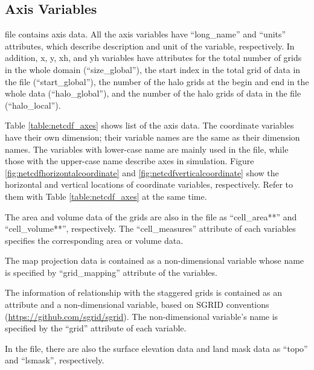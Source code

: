 \subsection{Axis Variables}
\scalenetcdf file contains axis data.
All the axis variables have 
``long\_name'' and ``units'' attributes,
which describe description and unit of the variable, respectively.
In addition, x, y, xh, and yh variables 
have attributes for the total number of grids in the whole domain (``size\_global''),
the start index in the total grid of data in the file (``start\_global''),
the number of the halo grids at the begin and end in the whole data (``halo\_global''),
and the number of the halo grids of data in the file (``halo\_local'').

Table \ref{table:netcdf_axes} shows list of the axis data.
The coordinate variables have their own dimension; their variable names are the same as their dimension names.
The variables with lower-case name are mainly used in the file, 
while those with the upper-case name describe axes in simulation.
Figure \ref{fig:netcdfhorizontalcoordinate} and \ref{fig:netcdfverticalcoordinate} show 
the horizontal and vertical locations of coordinate variables,
respectively.
Refer to them with Table \ref{table:netcdf_axes} at the same time.

The area and volume data of the grids are also in the file as ``cell\_area**'' and ``cell\_volume**'', respectively.
The ``cell\_measures'' attribute of each variables specifies the corresponding area or volume data.

The map projection data is contained as a non-dimensional variable whose name is specified by ``grid\_mapping'' attribute of the variables.

The information of relationship with the staggered grids is contained as an attribute and a non-dimensional variable, based on SGRID conventions (\url{https://github.com/sgrid/sgrid}).
The non-dimensional variable's name is specified by the ``grid'' attribute of each variable.

In the file, there are also the surface elevation data and land mask data as ``topo'' and ``lsmask'', respectively.



